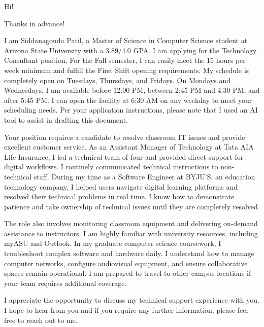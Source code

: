 \documentclass[10pt,a4paper,roman]{moderncv}
\begin{document}
\date{\today}
\opening{Hi!}
\closing{Thanks in advance!}
\makelettertitle

I am Siddanagouda Patil, a Master of Science in Computer Science student at Arizona State University with a 3.89/4.0 GPA. I am applying for the Technology Consultant position. For the Fall semester, I can easily meet the 15 hours per week minimum and fulfill the First Shift opening requirements. My schedule is completely open on Tuesdays, Thursdays, and Fridays. On Mondays and Wednesdays, I am available before 12:00 PM, between 2:45 PM and 4:30 PM, and after 5:45 PM. I can open the facility at 6:30 AM on any weekday to meet your scheduling needs. Per your application instructions, please note that I used an AI tool to assist in drafting this document.

\vspace{0.2cm}

Your position requires a candidate to resolve classroom IT issues and provide excellent customer service. As an Assistant Manager of Technology at Tata AIA Life Insurance, I led a technical team of four and provided direct support for digital workflows. I routinely communicated technical instructions to non-technical staff. During my time as a Software Engineer at BYJU'S, an education technology company, I helped users navigate digital learning platforms and resolved their technical problems in real time. I know how to demonstrate patience and take ownership of technical issues until they are completely resolved.

\vspace{0.2cm}

The role also involves monitoring classroom equipment and delivering on-demand assistance to instructors. I am highly familiar with university resources, including myASU and Outlook. In my graduate computer science coursework, I troubleshoot complex software and hardware daily. I understand how to manage computer networks, configure audiovisual equipment, and ensure collaborative spaces remain operational. I am prepared to travel to other campus locations if your team requires additional coverage.

\vspace{0.2cm}

I appreciate the opportunity to discuss my technical support experience with you. I hope to hear from you and if you require any further information, please feel free to reach out to me.

\vspace{0.5cm}

\makeletterclosing
\end{document}
